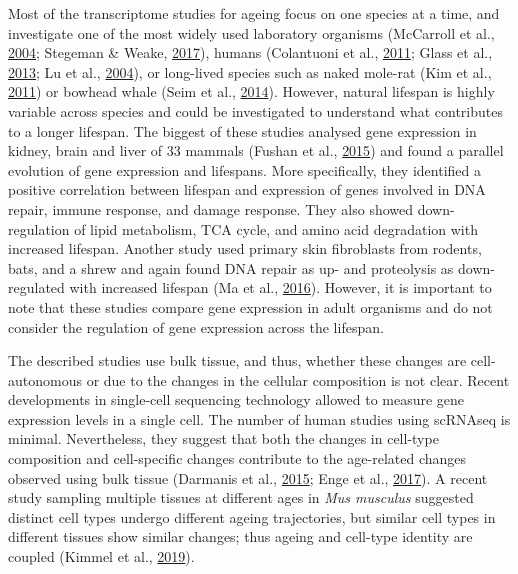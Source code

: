 \documentclass[12pt,twoside]{unicam}
\begin{document}
Most of the transcriptome studies for ageing focus on one species at a time, and investigate one of the most widely used laboratory organisms (McCarroll et al., \protect\hyperlink{ref-McCarroll2004}{2004}; Stegeman \& Weake, \protect\hyperlink{ref-Stegeman2017}{2017}), humans (Colantuoni et al., \protect\hyperlink{ref-Colantuoni2011}{2011}; Glass et al., \protect\hyperlink{ref-Glass2013}{2013}; Lu et al., \protect\hyperlink{ref-Lu2004}{2004}), or long-lived species such as naked mole-rat (Kim et al., \protect\hyperlink{ref-Kim2011}{2011}) or bowhead whale (Seim et al., \protect\hyperlink{ref-Seim2014}{2014}). However, natural lifespan is highly variable across species and could be investigated to understand what contributes to a longer lifespan. The biggest of these studies analysed gene expression in kidney, brain and liver of 33 mammals (Fushan et al., \protect\hyperlink{ref-Fushan2015}{2015}) and found a parallel evolution of gene expression and lifespans. More specifically, they identified a positive correlation between lifespan and expression of genes involved in DNA repair, immune response, and damage response. They also showed down-regulation of lipid metabolism, TCA cycle, and amino acid degradation with increased lifespan. Another study used primary skin fibroblasts from rodents, bats, and a shrew and again found DNA repair as up- and proteolysis as down-regulated with increased lifespan (Ma et al., \protect\hyperlink{ref-Ma2016}{2016}). However, it is important to note that these studies compare gene expression in adult organisms and do not consider the regulation of gene expression across the lifespan.

The described studies use bulk tissue, and thus, whether these changes are cell-autonomous or due to the changes in the cellular composition is not clear. Recent developments in single-cell sequencing technology allowed to measure gene expression levels in a single cell. The number of human studies using scRNAseq is minimal. Nevertheless, they suggest that both the changes in cell-type composition and cell-specific changes contribute to the age-related changes observed using bulk tissue (Darmanis et al., \protect\hyperlink{ref-Darmanis2015}{2015}; Enge et al., \protect\hyperlink{ref-Enge2017}{2017}). A recent study sampling multiple tissues at different ages in \emph{Mus musculus} suggested distinct cell types undergo different ageing trajectories, but similar cell types in different tissues show similar changes; thus ageing and cell-type identity are coupled (Kimmel et al., \protect\hyperlink{ref-Kimmel2019}{2019}).
\end{document}
